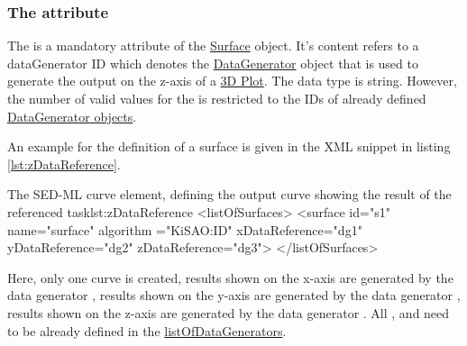 \subsubsection{The  attribute}
\label{sec:zDataReference}
The  is a mandatory attribute of the \hyperref[class:surface]{Surface} object. It's content refers to a dataGenerator ID which denotes the \hyperref[class:dataGenerator]{DataGenerator} object that is used to generate the output on the z-axis of a \hyperref[class:3DPlot]{3D Plot}.
The  data type is string. However, the number of valid values for the  is restricted to the IDs of already defined \hyperref[class:dataGenerator]{DataGenerator objects}.

An example for the definition of a surface is given in the XML snippet in listing \ref{lst:zDataReference}.
%
\begin{myXmlLst}{The SED-ML curve element, defining the output curve showing the result of the referenced task}{lst:zDataReference}
<listOfSurfaces>
  <surface id="s1" name="surface" algorithm ="KiSAO:ID" xDataReference="dg1" 
   yDataReference="dg2" zDataReference="dg3">
</listOfSurfaces>
\end{myXmlLst}
Here, only one curve is created, results shown on the x-axis are generated by the data generator , results shown on the y-axis are generated by the data generator , results shown on the z-axis are generated by the data generator . All ,  and  need to be already defined in the \hyperref[sec:listOfDataGenerators]{listOfDataGenerators}.

